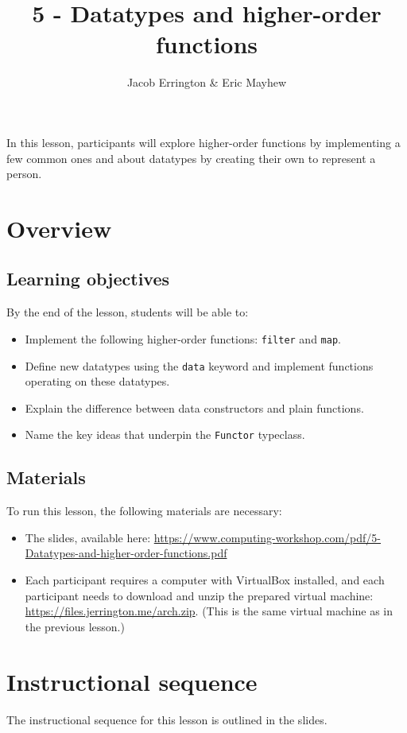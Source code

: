 \documentclass[11pt]{article}
\title{5 - Datatypes and higher-order functions}
\author{Jacob Errington \& Eric Mayhew}
\date{}
\newcommand{\cwurl}{https://www.computing-workshop.com/}
\newcommand{\cwpdf}{\cwurl pdf/}
\begin{document}
\maketitle

In this lesson, participants will explore higher-order functions by
implementing a few common ones and about datatypes by creating their own to
represent a person.

\section*{Overview}

\subsection*{Learning objectives}

By the end of the lesson, students will be able to:

\begin{itemize}
\item
  Implement the following higher-order functions: \texttt{filter} and
  \texttt{map}.
\item
  Define new datatypes using the \texttt{data} keyword and implement functions
  operating on these datatypes.
\item
  Explain the difference between data constructors and plain functions.
\item
  Name the key ideas that underpin the \texttt{Functor} typeclass.
\end{itemize}

\subsection*{Materials}

To run this lesson, the following materials are necessary:

\begin{itemize}
\item
  The slides, available here:
  \url{\cwpdf 5-Datatypes-and-higher-order-functions.pdf}
\item
  Each participant requires a computer with VirtualBox installed, and each
  participant needs to download and unzip the prepared virtual machine:
  \url{https://files.jerrington.me/arch.zip}.
  (This is the same virtual machine as in the previous lesson.)
\end{itemize}

\section*{Instructional sequence}

The instructional sequence for this lesson is outlined in the slides.
\end{document}
